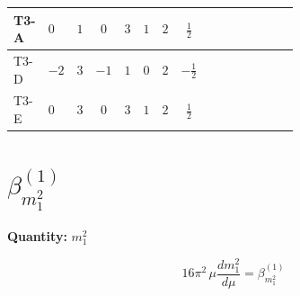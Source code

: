 \documentclass[8pt]{article}
\begin{document}
\begin{landscape}
\begin{longtable}{@{}llcccccc >{\raggedright\arraybackslash}p{0.21\linewidth} >{\raggedright\arraybackslash}p{0.21\linewidth} >{\raggedright\arraybackslash}p{0.21\linewidth}@{}}
\midrule
T3-A & $0$ & $1$ & $0$ & $3$ & $1$ & $2$ & $\frac{1}{2}$ & \scriptsize\adjustbox{max width=\linewidth}{$\begin{gathered} +\frac{3}{2} \left({Y_e}\,\left({Y_e}\right)^{\dagger}\,{Y_e}\right)_{ij}\end{gathered}$} & \scriptsize\adjustbox{max width=\linewidth}{$\begin{gathered} -\frac{9}{4} {g_2}^2 \left({Y_e}\right)_{ij}\end{gathered}$} & \scriptsize\adjustbox{max width=\linewidth}{$\begin{gathered} -\frac{15}{4} {g_1}^2 \left({Y_e}\right)_{ij}\end{gathered}$} \\
\midrule
T3-D & $-2$ & $3$ & $-1$ & $1$ & $0$ & $2$ & $-\frac{1}{2}$ & \scriptsize\adjustbox{max width=\linewidth}{$\begin{gathered} +\frac{3}{2} \left({Y_e}\,\left({Y_e}\right)^{\dagger}\,{Y_e}\right)_{ij}\end{gathered}$} & \scriptsize\adjustbox{max width=\linewidth}{$\begin{gathered} -\frac{9}{4} {g_2}^2 \left({Y_e}\right)_{ij}\end{gathered}$} & \scriptsize\adjustbox{max width=\linewidth}{$\begin{gathered} -\frac{15}{4} {g_1}^2 \left({Y_e}\right)_{ij}\end{gathered}$} \\
\midrule
T3-E & $0$ & $3$ & $0$ & $3$ & $1$ & $2$ & $\frac{1}{2}$ & \scriptsize\adjustbox{max width=\linewidth}{$\begin{gathered} +\frac{3}{2} \left({Y_e}\,\left({Y_e}\right)^{\dagger}\,{Y_e}\right)_{ij}\end{gathered}$} & \scriptsize\adjustbox{max width=\linewidth}{$\begin{gathered} -\frac{9}{4} {g_2}^2 \left({Y_e}\right)_{ij}\end{gathered}$} & \scriptsize\adjustbox{max width=\linewidth}{$\begin{gathered} -\frac{15}{4} {g_1}^2 \left({Y_e}\right)_{ij}\end{gathered}$} \\
\midrule
\bottomrule
\end{longtable}
\clearpage
\section*{$\beta_{m_1^2}^{(1)}$}
\noindent\textbf{Quantity: }$m_1^2$\par\smallskip
\[16\pi^2\,\mu\frac{d m_1^2}{d\mu}=\beta_{m_1^2}^{(1)}\]

\end{landscape}
\end{document}
